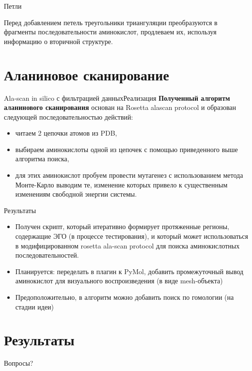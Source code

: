 \documentclass[12pt, xcolor={dvipsnames}]{beamer}
\begin{document}
\begin{frame}{Петли}

Перед добавлением петель треугольники триангуляции преобразуются в фрагменты последовательности аминокислот, продлеваем их, используя информацию о вторичной структуре.

\end{frame}
\section{Аланиновое сканирование}

\begin{frame}{Ala-scan in silico с фильтрацией данных}{Реализация}
\textbf{Полученный алгоритм аланинового сканирования} основан на Rosetta alascan protocol и образован следующей последовательностью действий:
\begin{itemize}
\item читаем 2 цепочки атомов из PDB,
\item выбираем аминокислоты одной из цепочек с помощью приведенного выше алгоритма поиска,
\item для этих аминокислот пробуем провести мутагенез с использованием метода Монте-Карло выводим те, изменение которых привело к существенным изменениям свободной энергии системы.
\end{itemize}
\end{frame}

\begin{frame}{Результаты}
\begin{itemize}
\item Получен скрипт, который итеративно формирует протяженные регионы, содержащие ЭГО (в процессе тестирования), и который может использоваться в модифицированном rosetta ala-scan protocol для поиска аминокислотных последовательностей.
\item Планируется: переделать в плагин к PyMol, добавить промежуточный вывод аминокислот для визуального воспроизведения (в виде mesh-объекта)
\item Предоположительно, в алгоритм можно добавить поиск по гомологии (на стадии идеи)
\end{itemize}
\end{frame}

\section{Результаты}

\begin{frame}{}
Вопросы?
\end{frame}
\begin{frame}


\begin{center}
\resizebox{\textheight}{!}{
\ttfamily
\footnotesize
\aapicture
}
\end{center}

\end{frame}
\end{document}
